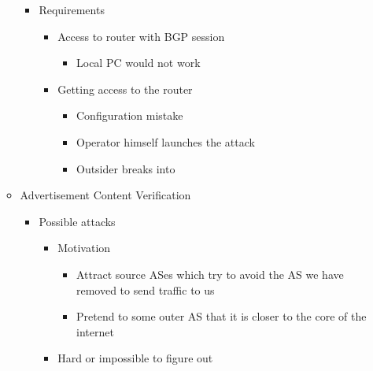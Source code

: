 \begin{itemize}
\begin{itemize}
\begin{itemize}
                    \item Requirements
                        \begin{itemize}
                            \item Access to router with BGP session
                                \begin{itemize}
                                    \item Local PC would not work
                                \end{itemize}
                            \item Getting access to the router
                                \begin{itemize}
                                    \item Configuration mistake
                                    \item Operator himself launches the attack
                                    \item Outsider breaks into
                                \end{itemize}
                        \end{itemize}
                \end{itemize}
            \item Advertisement Content Verification
                \begin{itemize}
                     No-one checks the content an AS sends
                    \item Possible attacks
                        \begin{itemize}
                                \begin{itemize}
                                    \item Motivation
                                        \begin{itemize}
                                            \item Attract source ASes which try to avoid the AS we have removed to send traffic to us
                                            \item Pretend to some outer AS that it is closer to the core of the internet
                                        \end{itemize}
                                    \item Hard or impossible to figure out
                                        \begin{itemize}

\end{itemize}
\end{itemize}
\end{itemize}
\end{itemize}
\end{itemize}
\end{itemize}
